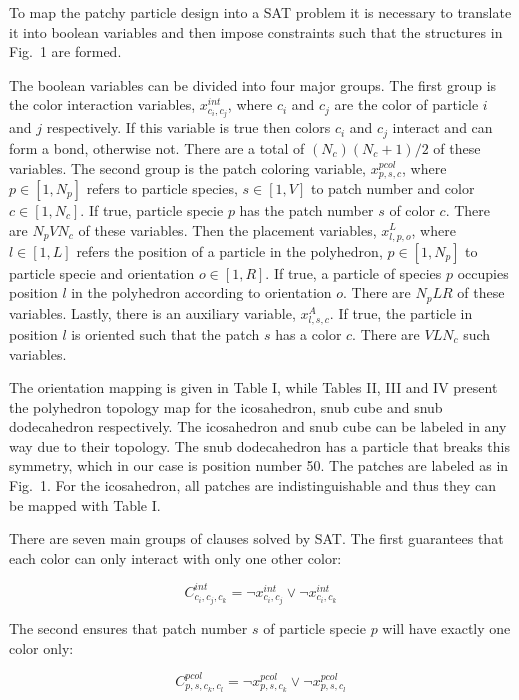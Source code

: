 \documentclass[a4paper, amsfonts, amssymb, amsmath, reprint, showkeys, nofootinbib, oneside]{revtex4-1}
\begin{document}
To map the patchy particle design into a SAT problem it is necessary to translate it into boolean variables and then impose constraints such that the structures in Fig.~1 are formed.

The boolean variables can be divided into four major groups. The first group is the color interaction variables, $x_{c_i,c_j}^{int}$, where $c_i$ and $c_j$ are the color of particle $i$ and $j$ respectively. If this variable is true then colors $c_i$ and $c_j$ interact and can form a bond, otherwise not. There are a total of $(N_c)(N_c+1)/2$ of these variables. The second group is the patch coloring variable, $x_{p,s,c}^{pcol}$, where $p\in [1, N_p]$ refers to particle species, $s\in [1, V]$ to patch number and color $c\in [1, N_c]$. If true, particle specie $p$ has the patch number $s$ of color $c$. There are $N_pVN_c$ of these variables. Then the placement variables, $x_{l,p,o}^{L}$, where $l\in [1, L]$ refers the position of a particle in the polyhedron, $p\in [1, N_p]$ to particle specie and orientation $o\in [1, R]$. If true, a particle of species $p$ occupies position $l$ in the polyhedron according to orientation $o$. There are $N_pLR$ of these variables. Lastly, there is an auxiliary variable, $x_{l,s,c}^{A}$. If true, the particle in position $l$ is oriented such that the patch $s$ has a color $c$. There are $VLN_c$ such variables.

The orientation mapping is given in Table I, while Tables II, III and IV present the polyhedron topology map for the icosahedron, snub cube and snub dodecahedron respectively. The icosahedron and snub cube can be labeled in any way due to their topology. The snub dodecahedron has a particle that breaks this symmetry, which in our case is position number 50. The patches are labeled as in Fig.~1. For the icosahedron, all patches are indistinguishable and thus they can be mapped with Table I.

There are seven main groups of clauses solved by SAT. The first guarantees that each color can only interact with only one other color:

\begin{equation}
C^{int}_{c_i,c_j,c_k}=\neg x_{c_i,c_j}^{int} \vee \neg x_{c_i,c_k}^{int}
\end{equation}

The second ensures that patch number $s$ of particle specie $p$ will have exactly one color only:

\begin{equation}
C^{pcol}_{p,s,c_k,c_l}=\neg x_{p,s,c_k}^{pcol} \vee \neg x_{p,s,c_l}^{pcol}
\end{equation}
\end{document}
